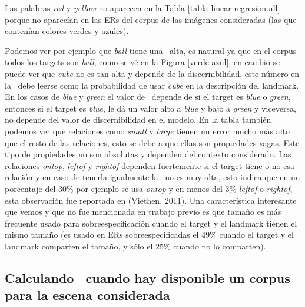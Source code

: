 Las palabras {\it red} y {\it yellow} no aparecen en la Tabla \ref{tabla-linear-regresion-all} porque no aparec\'ian en las ERs del corpus de las im\'agenes consideradas (las que conten\'ian colores verdes y azules).



Podemos ver por ejemplo que {\it ball} tiene una \puse\ alta, es natural ya que en el corpus todos los targets son {\it ball}, como se v\'e en la Figura \ref{verde-azul}, en cambio se puede ver que {\it cube} no es tan alta y depende de la discernibilidad, este n\'umero en la \puse\ debe leerse como la probabilidad de usar {\it cube} en la descripci\'on del landmark. En los casos de {\it blue} y {\it green} el valor de \puse\ depende de si el target es {\it blue} o {\it green}, entonces si el target es {\it blue}, le d\'a un valor alto a {\it blue} y bajo a {\it green} y viceversa, no depende del valor de discernibilidad en el modelo. En la tabla tambi\'en podemos ver que relaciones como {\it small} y {\it large} tienen un error mucho m\'as alto que el resto de las relaciones, esto se debe a que ellas son propiedades vagas. Este tipo de propiedades no son absolutas y dependen del contexto considerado.
Las relaciones {\it ontop}, {\it leftof} y {\it rightof} dependen fuertemente si el target tiene o no esa relaci\'on y en caso de tenerla igualmente la \puse\ no es muy alta, esto indica que en un porcentaje del 30\% por ejemplo se usa {\it ontop} y en menos del 3\% {\it leftof} o {\it rightof}, esta observaci\'on fue reportada en (Viethen, 2011). Una caracter\'istica interesante que vemos y que no fue mencionada en trabajo previo es que tama\~no es m\'as frecuente usado para sobreespecificaci\'on cuando el target y el landmark tienen el mismo tama\~no 
(es usado en ERs sobreespecificadas el 49\% cuando el target y el landmark comparten el tama\~no, y s\'olo el 25\% cuando no lo comparten).


\subsection{Calculando \puse\ cuando hay disponible un corpus para la escena considerada}

